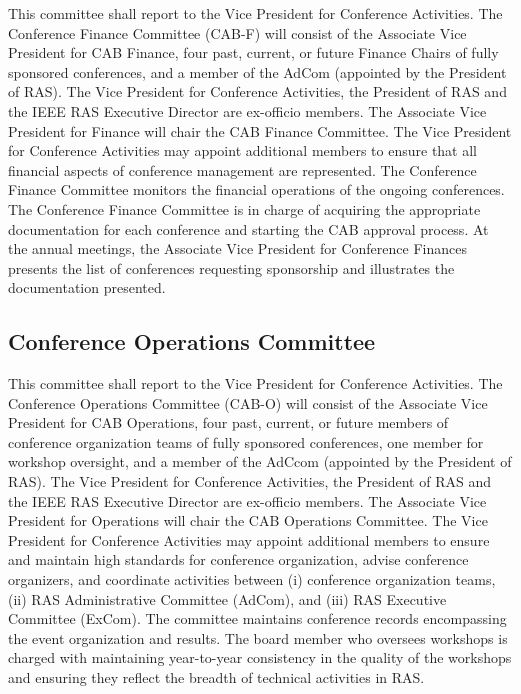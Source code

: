 \documentclass[10pt]{article}
\begin{document}
This committee shall report to the Vice President for Conference Activities. The Conference Finance Committee (CAB-F) will consist of the Associate Vice President for CAB Finance, four past, current, or future Finance Chairs of fully sponsored conferences, and a member of the AdCom (appointed by the President of RAS).   The Vice President for Conference Activities, the President of RAS and the IEEE RAS Executive Director are ex-officio members. The Associate Vice President for Finance will chair the CAB Finance Committee. The Vice President for Conference Activities may appoint additional members to ensure that all financial aspects of conference management are represented. The Conference Finance Committee monitors the financial operations of the ongoing conferences. The Conference Finance Committee is in charge of acquiring the appropriate documentation for each conference and starting the CAB approval process. At the annual meetings, the Associate Vice President for Conference Finances presents the list of conferences requesting sponsorship and illustrates the documentation presented.

\subsection{Conference Operations Committee}

This committee shall report to the Vice President for Conference Activities. The Conference Operations Committee (CAB-O) will consist of the Associate Vice President for CAB Operations, four past, current, or future members of conference organization teams of fully sponsored conferences, one member for workshop oversight, and a member of the AdCcom (appointed by the President of RAS).  The Vice President for Conference Activities, the President of RAS and the IEEE RAS Executive Director are ex-officio members. The Associate Vice President for Operations will chair the CAB Operations Committee. The Vice President for Conference Activities may appoint additional members to ensure and maintain high standards for conference organization, advise conference organizers, and coordinate activities between (i) conference organization teams, (ii) RAS Administrative Committee (AdCom), and (iii) RAS Executive Committee (ExCom). The committee maintains conference records encompassing the event organization and results.
The board member who oversees workshops is charged with maintaining year-to-year consistency in the quality of the workshops and ensuring they reflect the breadth of technical activities in RAS.
\end{document}
